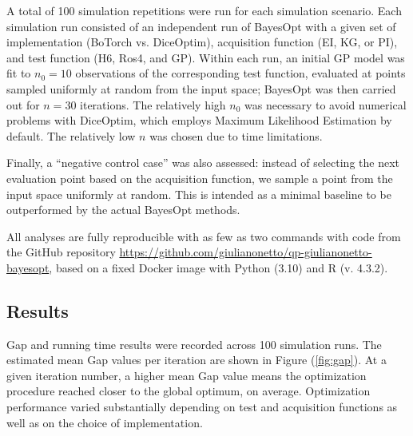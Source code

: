 A total of 100 simulation repetitions were run for each simulation scenario. Each simulation run consisted of an independent run of BayesOpt with a given set of implementation (BoTorch vs. DiceOptim), acquisition function (EI, KG, or PI), and test function (H6, Ros4, and GP). Within each run, an initial GP model was fit to $n_0=10$ observations of the corresponding test function, evaluated at points sampled uniformly at random from the input space; BayesOpt was then carried out for $n=30$ iterations. The relatively high $n_0$ was necessary to avoid numerical problems with DiceOptim, which employs Maximum Likelihood Estimation by default. The relatively low $n$ was chosen due to time limitations.

Finally, a ``negative control case'' was also assessed: instead of selecting the next evaluation point based on the acquisition function, we sample a point from the input space uniformly at random. This is intended as a minimal baseline to be outperformed by the actual BayesOpt methods.

All analyses are fully reproducible with as few as two commands with code from the GitHub repository \href{https://github.com/giulianonetto/qp-giulianonetto-bayesopt}{https://github.com/giulianonetto/qp-giulianonetto-bayesopt}, based on a fixed Docker image \cite{merkel2014} with Python (3.10) and R (v. 4.3.2).
\subsection{Results}
Gap and running time results were recorded across 100 simulation runs. The estimated mean Gap values per iteration are shown in Figure (\ref{fig:gap}). At a given iteration number, a higher mean Gap value means the optimization procedure reached closer to the global optimum, on average. Optimization performance varied substantially depending on test and acquisition functions as well as on the choice of implementation.

